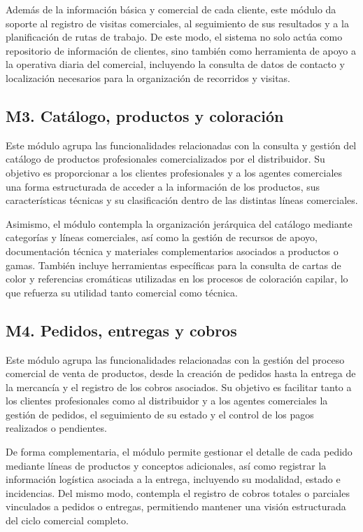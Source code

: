 Además de la información básica y comercial de cada cliente, este módulo da soporte al registro de visitas comerciales, al seguimiento de sus resultados y a la planificación de rutas de trabajo. De este modo, el sistema no solo actúa como repositorio de información de clientes, sino también como herramienta de apoyo a la operativa diaria del comercial, incluyendo la consulta de datos de contacto y localización necesarios para la organización de recorridos y visitas.

\subsection{M3. Catálogo, productos y coloración}

Este módulo agrupa las funcionalidades relacionadas con la consulta y gestión del catálogo de productos profesionales comercializados por el distribuidor. Su objetivo es proporcionar a los clientes profesionales y a los agentes comerciales una forma estructurada de acceder a la información de los productos, sus características técnicas y su clasificación dentro de las distintas líneas comerciales.

Asimismo, el módulo contempla la organización jerárquica del catálogo mediante categorías y líneas comerciales, así como la gestión de recursos de apoyo, documentación técnica y materiales complementarios asociados a productos o gamas. También incluye herramientas específicas para la consulta de cartas de color y referencias cromáticas utilizadas en los procesos de coloración capilar, lo que refuerza su utilidad tanto comercial como técnica.

\subsection{M4. Pedidos, entregas y cobros}

Este módulo agrupa las funcionalidades relacionadas con la gestión del proceso comercial de venta de productos, desde la creación de pedidos hasta la entrega de la mercancía y el registro de los cobros asociados. Su objetivo es facilitar tanto a los clientes profesionales como al distribuidor y a los agentes comerciales la gestión de pedidos, el seguimiento de su estado y el control de los pagos realizados o pendientes.

De forma complementaria, el módulo permite gestionar el detalle de cada pedido mediante líneas de productos y conceptos adicionales, así como registrar la información logística asociada a la entrega, incluyendo su modalidad, estado e incidencias. Del mismo modo, contempla el registro de cobros totales o parciales vinculados a pedidos o entregas, permitiendo mantener una visión estructurada del ciclo comercial completo.

